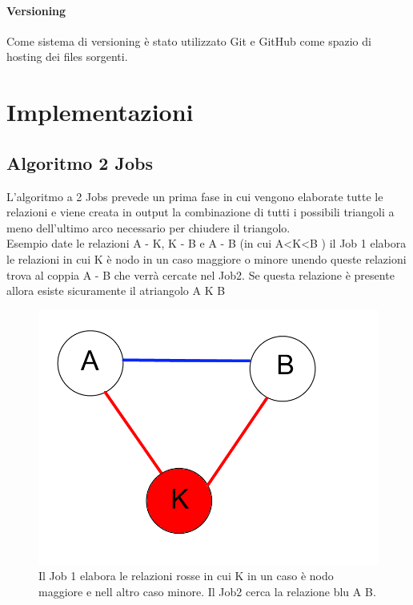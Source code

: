 \documentclass[paper=a4, fontsize=11pt]{scrartcl}	%
\numberwithin{equation}{section}															%
\numberwithin{figure}{section}																%
\numberwithin{table}{section}																%
\begin{document}
\paragraph{Versioning}
Come sistema di versioning è stato utilizzato Git e GitHub come spazio di hosting dei files sorgenti.


\section{Implementazioni}
\subsection{Algoritmo 2 Jobs}
L'algoritmo a 2 Jobs prevede un prima fase in cui vengono elaborate tutte le relazioni e viene creata in output la combinazione di tutti i possibili triangoli a meno dell'ultimo arco necessario per chiudere il triangolo.\\
Esempio date le relazioni A - K, K - B e A - B  (in cui A<K<B ) il Job 1 elabora le relazioni in cui K è nodo in un caso maggiore o minore unendo queste relazioni trova al coppia A - B che verrà cercate nel Job2. Se questa relazione è presente allora esiste sicuramente il atriangolo A K B


\begin{figure}[h]
\centering
        \includegraphics[totalheight=6cm]{Graph1.png}
    \caption{Il Job 1 elabora le relazioni rosse in cui K  in un caso è nodo  maggiore e nell altro caso minore. Il Job2 cerca la relazione blu A B.}
    \label{fig:verticalcell} 
\end{figure}
\end{document}
